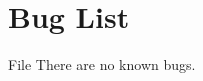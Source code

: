 \chapter{Bug List}
\hypertarget{bug}{}\label{bug}

\begin{DoxyRefList}
\item[File \doxylink{MyDLL_8h}{My\+DLL.h} ]\label{bug__bug000001}%
%
There are no known bugs.
\end{DoxyRefList}